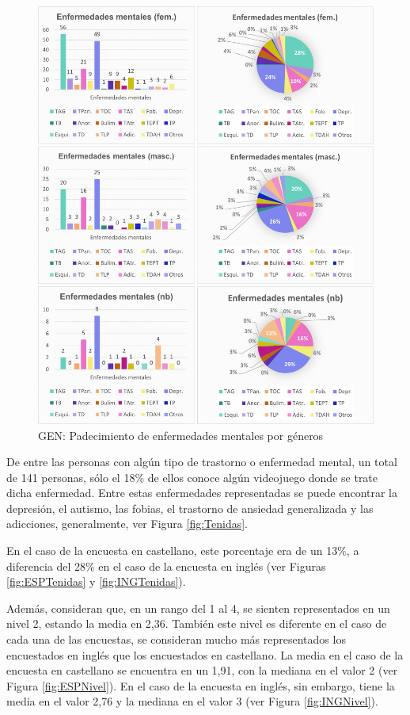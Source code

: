 \documentclass[12pt, a4paper,twoside,titlepage]{book}
\begin{document}
\begin{figure}
\centering
 \includegraphics[width=1\linewidth]{Imagenes Form GEN/Enfermedadesgeneros} 
 \caption{GEN: Padecimiento de enfermedades mentales por géneros}
 \label{fig:Enfgeneros}
 \end{figure}
 

De entre las personas con algún tipo de trastorno o enfermedad mental, un total de 141 personas, sólo el 18\% de ellos conoce algún videojuego donde se trate dicha enfermedad. Entre estas enfermedades representadas se puede encontrar la depresión, el autismo, las fobias, el trastorno de ansiedad generalizada y las adicciones, generalmente, ver Figura \ref{fig:Tenidas}. 

En el caso de la encuesta en castellano, este porcentaje era de un 13\%, a diferencia del 28\% en el caso de la encuesta en inglés (ver Figuras  \ref{fig:ESPTenidas} y \ref{fig:INGTenidas}). 

Además, consideran que, en un rango del 1 al 4, se sienten representados en un nivel 2, estando la media en 2,36. También este nivel es diferente en el caso de cada una de las encuestas, se consideran mucho más representados los encuestados en inglés que los encuestados en castellano. La media en el caso de la encuesta en castellano se encuentra en un 1,91, con la mediana en el valor 2 (ver Figura \ref{fig:ESPNivel}). En el caso de la encuesta en inglés, sin embargo, tiene la media en el valor 2,76 y la mediana en el valor 3 (ver Figura \ref{fig:INGNivel}). 
\end{document}
